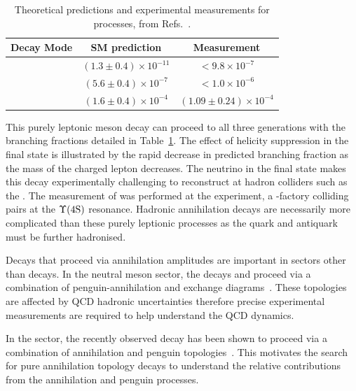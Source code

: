 \begin{table}[h]
   \begin{center}
      \begin{tabular}{lcc}
         \hline

         Decay Mode                 & SM prediction & Measurement \\
         \hline 
         \decay{\Bp}{\ep\neue}      & $(1.3\pm0.4)\times10^{-11}$           & $<9.8\times10^{-7}$\\
         \decay{\Bp}{\mup\neum}     & $(5.6\pm0.4)\times10^{-7}$            & $<1.0\times10^{-6}$\\
         \decay{\Bp}{\taup\neut}    & $(1.6\pm0.4)\times10^{-4}$&           $(1.09\pm0.24)\times 10^{-4}$ \\
         \hline
      \end{tabular}
   \end{center}
   \caption{Theoretical predictions and experimental measurements for \decay{\Bp}{\ellp\neul} processes, from Refs.~\cite{PhysRevD.92.051102,PhysRevD.79.091101,Satoyama:2006xn}.}
   \label{tab:Theory_B2ellnu}
\end{table}
This purely leptonic \Bp meson decay can proceed to all three generations with the branching fractions detailed in Table~\ref{tab:Theory_B2ellnu}. The effect of helicity suppression in the final state is illustrated by the rapid decrease in predicted branching fraction as the mass of the charged lepton decreases. The neutrino in the final state makes this decay experimentally challenging to reconstruct at hadron colliders such as the \lhc. The measurement of \decay{\Bp}{\taup\neut} was performed at the \belle experiment, a \B-factory colliding \ep\en pairs at the $\Upsilon(\text{4S})$ resonance. 
Hadronic annihilation decays are necessarily more complicated than these purely leptionic processes as the quark and antiquark must be further hadronised.

Decays that proceed via annihilation amplitudes are important in sectors other than \Bp decays. In the neutral \B meson sector, the decays \decay{\Bz}{\Kp\Km} and \decay{\Bs}{\pip\pim} proceed via a combination of penguin-annihilation and exchange diagrams~\cite{PhysRevLett.118.081801}. These topologies are affected by QCD hadronic uncertainties therefore precise experimental measurements are required to help understand the QCD dynamics.

In the \Bc sector, the recently observed \decay{\Bcp}{\Dz\Kp} decay has been shown to proceed via a combination of annihilation and penguin topologies~\cite{LHCb-PAPER-2016-058}. This motivates the search for pure annihilation topology decays to understand the relative contributions from the annihilation and penguin processes.

